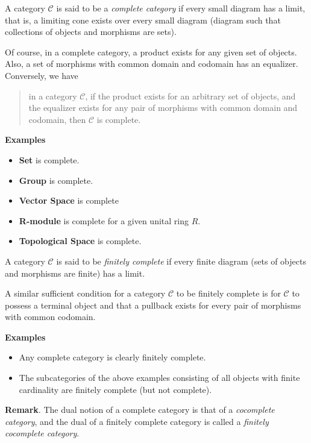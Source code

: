 \documentclass[12pt]{article}
\begin{document}
A category $\mathcal{C}$ is said to be a \emph{complete category} if every small diagram has a limit, that is, a limiting cone exists over every small diagram (diagram such that collections of objects and morphisms are sets).

Of course, in a complete category, a product exists for any given set of objects.  Also, a set of morphisms with common domain and codomain has an equalizer.  Conversely, we have
\begin{quote}
in a category $\mathcal{C}$, if the product exists for an arbitrary set of objects, and the equalizer exists for any pair of morphisms with common domain and codomain, then $\mathcal{C}$ is complete.
\end{quote}

\textbf{Examples}
\begin{itemize}
\item \textbf{Set} is complete.
\item \textbf{Group} is complete.
\item \textbf{Vector Space} is complete
\item \textbf{R-module} is complete for a given unital ring $R$.
\item \textbf{Topological Space} is complete.
\end{itemize}

A category $\mathcal{C}$ is said to be \emph{finitely complete} if every finite diagram (sets of objects and morphisms are finite) has a limit.

A similar sufficient condition for a category $\mathcal{C}$ to be finitely complete is for $\mathcal{C}$ to possess a terminal object and that a pullback exists for every pair of morphisms with common codomain.

\textbf{Examples}
\begin{itemize}
\item Any complete category is clearly finitely complete.
\item The subcategories of the above examples consisting of all objects with finite cardinality are finitely complete (but not complete).
\end{itemize}

\textbf{Remark}.  The dual notion of a complete category is that of a \emph{cocomplete category}, and the dual of a finitely complete category is called a \emph{finitely cocomplete category}.
\end{document}
